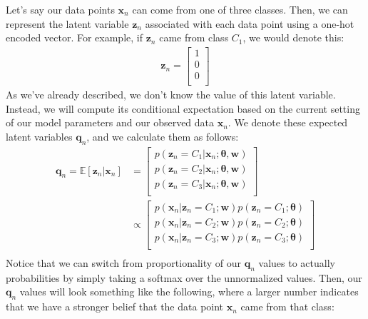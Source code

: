 Let's say our data points $\textbf{x}_n$ can come from one of three classes. Then, we can represent the latent variable $\textbf{z}_n$ associated with each data point using a one-hot encoded vector. For example, if $\textbf{z}_n$ came from class $C_1$, we would denote this:
\begin{align*}
    \textbf{z}_n = 
        \begin{bmatrix}
            1 \\
            0 \\
            0 \\
        \end{bmatrix}
\end{align*}
As we've already described, we don't know the value of this latent variable. Instead, we will compute its conditional expectation based on the current setting of our model parameters and our observed data $\textbf{x}_n$. We denote these expected latent variables $\textbf{q}_n$, and we calculate them as follows:
\begin{align*}
    \textbf{q}_n = \mathbb{E}[\textbf{z}_n | \textbf{x}_n] &= \begin{bmatrix}
            p(\textbf{z}_n = C_1 | \textbf{x}_n; \boldsymbol{\theta}, \textbf{w}) \\
            p(\textbf{z}_n = C_2 | \textbf{x}_n; \boldsymbol{\theta}, \textbf{w}) \\
            p(\textbf{z}_n = C_3 | \textbf{x}_n; \boldsymbol{\theta}, \textbf{w}) \\
        \end{bmatrix} \\
        &\propto \begin{bmatrix}
            p(\textbf{x}_n | \textbf{z}_n = C_1; \textbf{w})p(\textbf{z}_n = C_1; \boldsymbol{\theta}) \\
            p(\textbf{x}_n | \textbf{z}_n = C_2; \textbf{w})p(\textbf{z}_n = C_2; \boldsymbol{\theta}) \\
            p(\textbf{x}_n | \textbf{z}_n = C_3; \textbf{w})p(\textbf{z}_n = C_3; \boldsymbol{\theta}) \\
        \end{bmatrix} \\
\end{align*}
Notice that we can switch from proportionality of our $\textbf{q}_n$ values to actually probabilities by simply taking a softmax over the unnormalized values. Then, our $\textbf{q}_n$ values will look something like the following, where a larger number indicates that we have a stronger belief that the data point $\textbf{x}_n$ came from that class:

